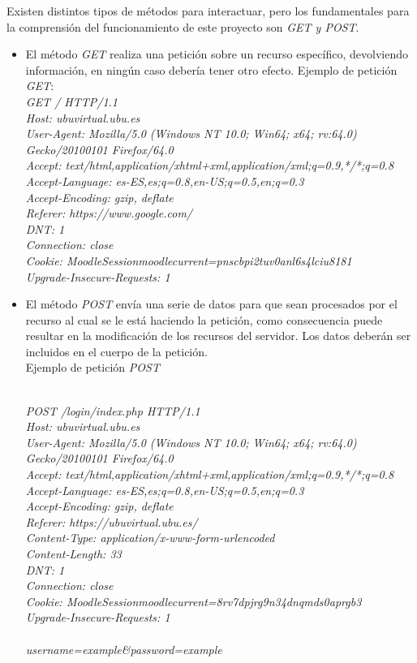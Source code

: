 Existen distintos tipos de métodos para interactuar, pero los fundamentales para la comprensión del funcionamiento de este proyecto son \emph{GET y POST}.
\begin{itemize}
	\item	El método \emph{GET} realiza una petición sobre un recurso específico, devolviendo información, en ningún caso debería tener otro efecto.
	Ejemplo de petición \emph{GET}:
\emph{ \\
GET / HTTP/1.1\\
Host: ubuvirtual.ubu.es\\
User-Agent: Mozilla/5.0 (Windows NT 10.0; Win64; x64; rv:64.0) Gecko/20100101 Firefox/64.0\\
Accept: text/html,application/xhtml+xml,application/xml;q=0.9,*/*;q=0.8\\
Accept-Language: es-ES,es;q=0.8,en-US;q=0.5,en;q=0.3\\
Accept-Encoding: gzip, deflate\\
Referer: https://www.google.com/\\
DNT: 1\\
Connection: close\\
Cookie: MoodleSessionmoodlecurrent=pnscbpi2tuv0anl6s4lciu8181\\
Upgrade-Insecure-Requests: 1\\
}	

\item		El método \emph{POST} envía una serie de datos para que sean procesados por el recurso al cual se le está haciendo la petición, como consecuencia puede resultar en la modificación de los recursos del servidor. Los datos deberán ser incluidos en el cuerpo de la petición.\\

Ejemplo de petición \emph{POST}

\emph{\\
POST /login/index.php HTTP/1.1\\
Host: ubuvirtual.ubu.es\\
User-Agent: Mozilla/5.0 (Windows NT 10.0; Win64; x64; rv:64.0) Gecko/20100101 Firefox/64.0\\
Accept: text/html,application/xhtml+xml,application/xml;q=0.9,*/*;q=0.8\\
Accept-Language: es-ES,es;q=0.8,en-US;q=0.5,en;q=0.3\\
Accept-Encoding: gzip, deflate\\
Referer: https://ubuvirtual.ubu.es/\\
Content-Type: application/x-www-form-urlencoded\\
Content-Length: 33\\
DNT: 1\\
Connection: close\\
Cookie: MoodleSessionmoodlecurrent=8rv7dpjrg9n34dnqmds0aprgb3\\
Upgrade-Insecure-Requests: 1\\
\\
username=example\&password=example\\
}

\end{itemize}

